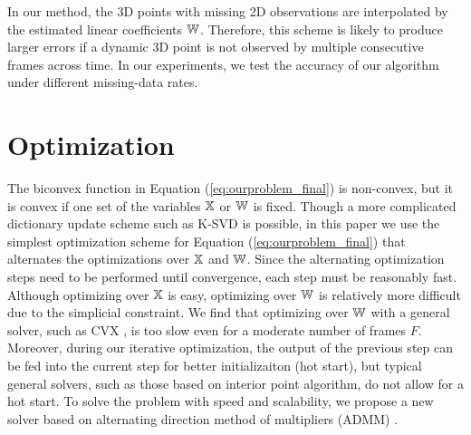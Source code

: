 In our method, the 3D points with missing 2D observations are interpolated by the estimated linear coefficients $\mathbb W$. Therefore, this scheme is likely to produce larger errors if a dynamic 3D point is not observed by multiple consecutive frames across time. In our experiments, we test the accuracy of our algorithm under different missing-data rates.




\section{Optimization}\label{sec:solver}

The biconvex function in Equation (\ref{eq:ourproblem_final}) is non-convex, but it is convex if one set of the variables $\mathbb X$ or $\mathbb W$ is fixed.
Though a  more complicated dictionary update scheme such as K-SVD \cite{aharon2006img} is possible,
in this paper we use the simplest optimization scheme for Equation (\ref{eq:ourproblem_final}) that alternates the optimizations over $\mathbb X$ and $\mathbb W$.
Since the alternating optimization steps need to be performed until convergence, each step must be reasonably fast.
Although optimizing over $\mathbb X$ is easy, optimizing over $\mathbb W$ is relatively more difficult due to the simplicial constraint.
We find that optimizing over $\mathbb W$ with a general solver, such as CVX \cite{cvx}, is too slow even for a moderate number of frames $F$.
Moreover, during our iterative optimization, the output of the previous step can be fed into the current step for better initializaiton (hot start), but typical general solvers, such as those based on interior point algorithm, do not allow for a hot start.
To solve the problem with speed and scalability, we propose a new solver based on alternating direction method of multipliers (ADMM) \cite{boyd2011distributed}.

